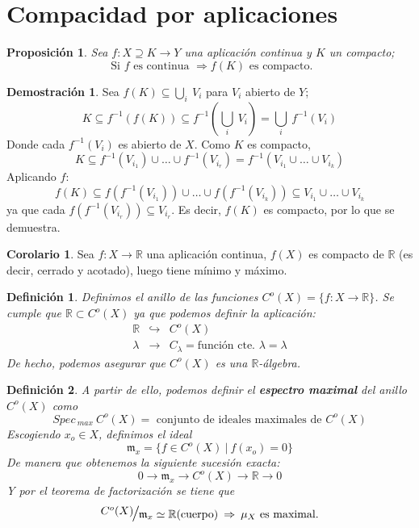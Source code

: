 \documentclass[12pt,twoside]{report}
\theoremstyle{azul}
\newtheorem*{defix}{Definición}
\theoremstyle{azul2}
\theoremstyle{plain}
\newtheorem*{prop}{Proposición}
\theoremstyle{definition}
\newtheorem*{dem}{Demostración}
\newtheorem*{cor}{Corolario}
\theoremstyle{remark}
\begin{document}
\section{Compacidad por aplicaciones} \label{compapl}
\begin{prop}
Sea $f: X \supseteq K \longrightarrow Y$ una aplicación continua y $K$ un compacto;
$$\text{ Si } f \text{ es continua } \Rightarrow f(K) \text{ es compacto.}$$
\end{prop}
\begin{dem}
Sea $f(K) \subseteq \underset{i}{\bigcup} \: V_i$ para $V_i$ abierto de $Y$;
$$K \subseteq f^{-1}(f(K)) \subseteq f^{-1}(\underset{i}{\bigcup} \: V_i) = \underset{i}{\bigcup} \: f^{-1}(V_i)$$
Donde cada $f^{-1}(V_i)$ es abierto de $X$. Como $K$ es compacto, 
$$K \subseteq f^{-1}(V_{i_1}) \cup \ldots \cup f^{-1}(V_{i_r}) = f^{-1}(V_{i_1} \cup \ldots \cup V_{i_k})$$
Aplicando $f$:
$$f(K) \subseteq f(f^{-1}(V_{i_1})) \cup \ldots \cup f(f^{-1}(V_{i_k})) \subseteq V_{i_1} \cup \ldots \cup V_{i_k} $$
ya que cada $f(f^{-1}(V_{i_r})) \subseteq V_{i_r}$. Es decir, $f(K)$ es compacto, por lo que se demuestra.
\end{dem}
\begin{cor}
Sea $f: X \longrightarrow \mathbb{R}$ una aplicación continua, $f(X)$ es compacto de $\mathbb{R}$ (es decir, cerrado y acotado), luego tiene mínimo y máximo.
\end{cor}
\begin{defix}
    Definimos el anillo de las funciones $C^o(X)=\{f:X \longrightarrow \mathbb{R}\}$. Se cumple que $\mathbb{R} \subset C^o(X)$ ya que podemos definir la aplicación:
    $$\begin{array}{rcl}
        \mathbb{R} & \hookrightarrow & C^o(X) \\
         \lambda & \longrightarrow & C_{\lambda}=\text{función cte. } \lambda= \lambda
    \end{array}$$
    De hecho, podemos asegurar que $C^o(X)$ es una $\mathbb{R}$-álgebra.
\end{defix} 
\begin{defix}
    A partir de ello, podemos definir el \textbf{espectro maximal} del anillo $C^o(X)$ como 
    $$Spec_{\: max}\: C^o(X)=\text{ conjunto de ideales maximales de } C^o(X)$$
Escogiendo $x_o \in X$, definimos el ideal
$$\mathfrak{m}_x=\{f \in C^o(X) \: | \: f(x_o)=0\}$$
De manera que obtenemos la siguiente sucesión exacta:
$$0 \longrightarrow \mathfrak{m}_{x} \longrightarrow C^o(X) \longrightarrow \mathbb{R} \longrightarrow 0$$
Y por el teorema de factorización se tiene que 
$$\mathlarger{\mathlarger{\nicefrac{C^o(X)}{\mathfrak{m}_x}}} \simeq \mathbb{R} (\text{cuerpo}) \: \Rightarrow \: \mu_X \text{ es maximal.}$$
\end{defix}
\end{document}
